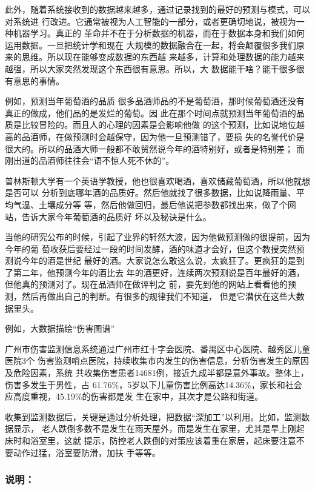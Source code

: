 \documentclass[11pt]{ctexart}
\begin{document}
{{{{此外，随着系统接收到的数据越来越多，通过记录找到的最好的预测与模式，可以对系统进
行改进。它通常被视为人工智能的一部分，或者更确切地说，被视为一种机器学习。真正的
革命并不在于分析数据的机器，而在于数据本身和我们如何运用数据。一旦把统计学和现在
大规模的数据融合在一起，将会颠覆很多我们原来的思维。所以现在能够变成数据的东西越
来越多，计算和处理数据的能力越来越强，所以大家突然发现这个东西很有意思。所以，大
数据能干啥？能干很多很有意思的事情。

例如，预测当年葡萄酒的品质
很多品酒师品的不是葡萄酒，那时候葡萄酒还没有真正的做成，他们品的是发烂的葡萄。因
此在那个时间点就预测当年葡萄酒的品质是比较冒险的。而且人的心理的因素是会影响他做
的这个预测，比如说地位越高的品酒师，在做预测时会越保守，因为他一旦预测错了，要损
失的名誉代价是很大的。所以的品酒大师一般都不敢贸然说今年的酒特别好，或者是特别差；
而刚出道的品酒师往往会“语不惊人死不休的”。

普林斯顿大学有一个英语学教授，他也很喜欢喝酒，喜欢储藏葡萄酒，所以他就想是否可以
分析到底哪年酒的品质好。然后他就找了很多数据，比如说降雨量、平均气温、土壤成分等
等，然后他做回归，最后他说把参数都找出来，做了个网站，告诉大家今年葡萄酒的品质好
坏以及秘诀是什么。


当他的研究公布的时候，引起了业界的轩然大波，因为他做预测做的很提前，因为今年的葡
萄收获后要经过一段的时间发酵，酒的味道才会好，但这个教授突然预测说今年的酒是世纪
最好的酒。大家说怎么敢这么说，太疯狂了。更疯狂的是到了第二年，他预测今年的酒比去
年的酒更好，连续两次预测说是百年最好的酒，但他真的预测对了。现在品酒师在做评判之
前，要先到他的网站上看看他的预测，然后再做出自己的判断。有很多的规律我们不知道，
但是它潜伏在这些大数据里头。

例如，大数据描绘“伤害图谱”

广州市伤害监测信息系统通过广州市红十字会医院、番禺区中心医院、越秀区儿童医院3个
伤害监测哨点医院，持续收集市内发生的伤害信息，分析伤害发生的原因及危险因素，系统
共收集伤害患者14681例，接近九成半都是意外事故。整体上，伤害多发生于男性，占
61.76\%，5岁以下儿童伤害比例高达14.36\%，家长和社会应高度重视，45.19\%的伤害都是发
生在家中，其次才是公路和街道。

收集到监测数据后，关键是通过分析处理，把数据“深加工”以利用。比如，监测数据显示，
老人跌倒多数不是发生在雨天屋外，而是发生在家里，尤其是旱上刚起床时和浴室里，这就
提示，防控老人跌倒的对策应该着重在家居，起床要注意不要动作过猛，浴室要防滑，加扶
手等等。

\subsubsection{说明：}
\label{sec:org6174965}

}}}}
\end{document}
